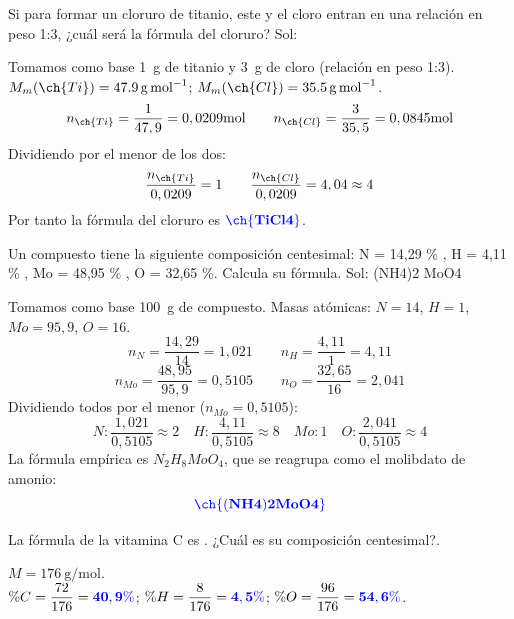 \begin{exercise}
    Si para formar un cloruro de titanio, este y el cloro entran en una relación en peso 1:3, ¿cuál será la fórmula del cloruro? Sol: 
    \begin{solu}
        Tomamos como base \qty{1}{\g} de titanio y \qty{3}{\g} de cloro (relación en peso 1:3). $M_m(\ch{Ti}) = \qty{47.9}{\g\per\mol}$; $M_m(\ch{Cl}) = \qty{35.5}{\g\per\mol}$.
        \[ n_{\ch{Ti}} = \dfrac{1}{47,9} = 0,0209 \si{\mol} \qquad n_{\ch{Cl}} = \dfrac{3}{35,5} = 0,0845 \si{\mol} \]
        Dividiendo por el menor de los dos:
        \[ \dfrac{n_{\ch{Ti}}}{0,0209} = 1 \qquad \dfrac{n_{\ch{Cl}}}{0,0209} = 4,04 \approx 4 \]
        Por tanto la fórmula del cloruro es \(\mathbf{\textcolor{blue}{\ch{TiCl4}}}\).
    \end{solu}
\end{exercise}

\begin{exercise}
    Un compuesto tiene la siguiente composición centesimal: N = 14,29 \% , H = 4,11 \% , Mo = 48,95 \% , O = 32,65  \%. Calcula su fórmula. Sol: (NH4)2 MoO4
    \begin{solu}
        Tomamos como base \qty{100}{\g} de compuesto. Masas atómicas: $N=14$, $H=1$, $Mo=95,9$, $O=16$.
        \[ n_N = \dfrac{14,29}{14} = 1,021 \qquad n_H = \dfrac{4,11}{1} = 4,11 \]
        \[ n_{Mo} = \dfrac{48,95}{95,9} = 0,5105 \qquad n_O = \dfrac{32,65}{16} = 2,041 \]
        Dividiendo todos por el menor ($n_{Mo} = 0,5105$):
        \[ N: \dfrac{1,021}{0,5105} \approx 2 \quad H: \dfrac{4,11}{0,5105} \approx 8 \quad Mo: 1 \quad O: \dfrac{2,041}{0,5105} \approx 4 \]
        La fórmula empírica es \(N_2H_8MoO_4\), que se reagrupa como el molibdato de amonio:
        \[ \mathbf{\textcolor{blue}{\ch{(NH4)2MoO4}}} \]
    \end{solu}
\end{exercise}

\begin{exercise}
    La fórmula de la vitamina C es . ¿Cuál es su composición centesimal?.
    \begin{solu}
        $M = \qty{176}{\g\per\mol}$. \\
        $\%C = \dfrac{72}{176} = \mathbf{\textcolor{blue}{40,9 \%}}$; $\%H = \dfrac{8}{176} = \mathbf{\textcolor{blue}{4,5 \%}}$; $\%O = \dfrac{96}{176} = \mathbf{\textcolor{blue}{54,6 \%}}$.
    \end{solu}
\end{exercise}

